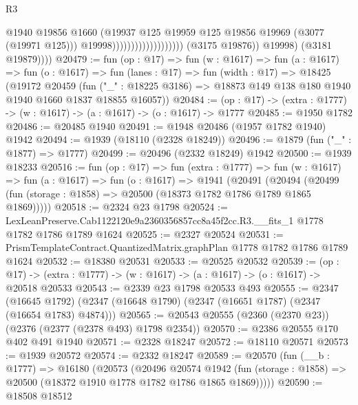 \begin{lexlean}{R3}
\begin{coremodule}
                                                    @1940
                                                    @19856
                                                    @1660
                                                    (@19937
                                                      @125
                                                      @19959
                                                      @125
                                                      @19856
                                                      @19969
                                                      (@3077 (@19971 @125)))
                                                    @19998)))))))))))))))))))
              (@3175 @19876))
            @19998)
          (@3181 @19879))))
@20479 := fun (op : @17) =>
  fun (w : @1617) =>
  fun (a : @1617) =>
  fun (o : @1617) =>
  fun (lanes : @17) =>
  fun (width : @17) =>
  @18425
    (@19172
      @20459
      (fun ("_" : @18225 @3186) => @18873 @149 @138 @180 @1940 @1940 @1660 @1837 @18855 @16057))
@20484 := (op : @17) -> (extra : @1777) -> (w : @1617) -> (a : @1617) -> (o : @1617) -> @1777
@20485 := @1950 @1782
@20486 := @20485 @1940
@20491 := @1948 @20486 (@1957 @1782 @1940) @1942
@20494 := @1939 (@18110 (@2328 @18249))
@20496 := @1879 (fun ("_" : @1877) => @1777)
@20499 := @20496 (@2332 @18249) @1942
@20500 := @1939 @18233
@20516 := fun (op : @17) =>
  fun (extra : @1777) =>
  fun (w : @1617) =>
  fun (a : @1617) =>
  fun (o : @1617) =>
  @1941
    (@20491
      (@20494 (@20499 (fun (storage : @1858) => @20500 (@18373 @1782 @1786 @1789 @1865 @1869)))))
@20518 := @2324 @23 @1798
@20524 := LexLeanPreserve.Cab1122120e9a2360356857cc8a45f2cc.R3.__fits_1
    @1778
    @1782
    @1786
    @1789
    @1624
@20525 := @2327 @20524
@20531 := PrismTemplateContract.QuantizedMatrix.graphPlan @1778 @1782 @1786 @1789 @1624
@20532 := @18380 @20531
@20533 := @20525 @20532
@20539 := (op : @17) ->
  (extra : @1777) -> (w : @1617) -> (a : @1617) -> (o : @1617) -> @20518 @20533
@20543 := @2339 @23 @1798 @20533 @493
@20555 := @2347
    (@16645 @1792)
    (@2347 (@16648 @1790) (@2347 (@16651 @1787) (@2347 (@16654 @1783) @4874)))
@20565 := @20543 @20555 (@2360 (@2370 @23)) (@2376 (@2377 (@2378 @493) @1798 @2354))
@20570 := @2386 @20555 @170 @402 @491 @1940
@20571 := @2328 @18247
@20572 := @18110 @20571
@20573 := @1939 @20572
@20574 := @2332 @18247
@20589 := @20570
    (fun (__b : @1777) =>
    @16180
      (@20573
        (@20496
          @20574
          @1942
          (fun (storage : @1858) => @20500 (@18372 @1910 @1778 @1782 @1786 @1865 @1869)))))
@20590 := @18508 @18512

\end{coremodule}
\end{lexlean}
